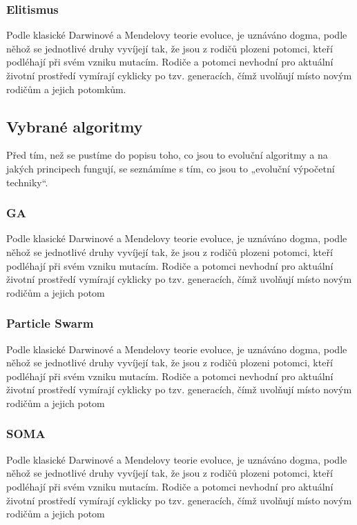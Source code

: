 \documentclass[bc,male,java,dept460]{diploma}		%
\begin{document}
\subsubsection{Elitismus}
Podle klasické Darwinové a Mendelovy teorie evoluce, je uznáváno dogma, podle něhož se jednotlivé druhy vyvíjejí tak, že jsou z rodičů plozeni potomci, kteří podléhají při svém vzniku mutacím. Rodiče a potomci nevhodní pro aktuální životní prostředí vymírají cyklicky po tzv. generacích, čímž uvolňují místo novým rodičům a jejich potomkům.

\subsection{Vybrané algoritmy}
Před tím, než se pustíme do popisu toho, co jsou to evoluční algoritmy a na jakých principech fungují, se seznámíme s tím, co jsou to „evoluční výpočetní techniky“.

\subsubsection{GA}
Podle klasické Darwinové a Mendelovy teorie evoluce, je uznáváno dogma, podle něhož se jednotlivé druhy vyvíjejí tak, že jsou z rodičů plozeni potomci, kteří podléhají při svém vzniku mutacím. Rodiče a potomci nevhodní pro aktuální životní prostředí vymírají cyklicky po tzv. generacích, čímž uvolňují místo novým rodičům a jejich potom

\subsubsection{Particle Swarm}
Podle klasické Darwinové a Mendelovy teorie evoluce, je uznáváno dogma, podle něhož se jednotlivé druhy vyvíjejí tak, že jsou z rodičů plozeni potomci, kteří podléhají při svém vzniku mutacím. Rodiče a potomci nevhodní pro aktuální životní prostředí vymírají cyklicky po tzv. generacích, čímž uvolňují místo novým rodičům a jejich potom

\subsubsection{SOMA}
Podle klasické Darwinové a Mendelovy teorie evoluce, je uznáváno dogma, podle něhož se jednotlivé druhy vyvíjejí tak, že jsou z rodičů plozeni potomci, kteří podléhají při svém vzniku mutacím. Rodiče a potomci nevhodní pro aktuální životní prostředí vymírají cyklicky po tzv. generacích, čímž uvolňují místo novým rodičům a jejich potom
\end{document}
